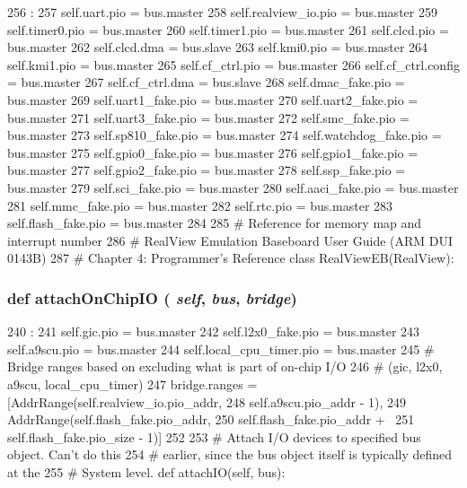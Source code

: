 \begin{DoxyCode}
256                            :
257        self.uart.pio          = bus.master
258        self.realview_io.pio   = bus.master
259        self.timer0.pio        = bus.master
260        self.timer1.pio        = bus.master
261        self.clcd.pio          = bus.master
262        self.clcd.dma          = bus.slave
263        self.kmi0.pio          = bus.master
264        self.kmi1.pio          = bus.master
265        self.cf_ctrl.pio       = bus.master
266        self.cf_ctrl.config    = bus.master
267        self.cf_ctrl.dma       = bus.slave
268        self.dmac_fake.pio     = bus.master
269        self.uart1_fake.pio    = bus.master
270        self.uart2_fake.pio    = bus.master
271        self.uart3_fake.pio    = bus.master
272        self.smc_fake.pio      = bus.master
273        self.sp810_fake.pio    = bus.master
274        self.watchdog_fake.pio = bus.master
275        self.gpio0_fake.pio    = bus.master
276        self.gpio1_fake.pio    = bus.master
277        self.gpio2_fake.pio    = bus.master
278        self.ssp_fake.pio      = bus.master
279        self.sci_fake.pio      = bus.master
280        self.aaci_fake.pio     = bus.master
281        self.mmc_fake.pio      = bus.master
282        self.rtc.pio           = bus.master
283        self.flash_fake.pio    = bus.master
284 
285 # Reference for memory map and interrupt number
286 # RealView Emulation Baseboard User Guide (ARM DUI 0143B)
287 # Chapter 4: Programmer's Reference
class RealViewEB(RealView):
\end{DoxyCode}
\hypertarget{classRealView_1_1RealViewPBX_abd74cec934f25d2881d5fdd0d5e7f512}{
\subsubsection[{attachOnChipIO}]{\setlength{\rightskip}{0pt plus 5cm}def attachOnChipIO ( {\em self}, \/   {\em bus}, \/   {\em bridge})}}
\label{classRealView_1_1RealViewPBX_abd74cec934f25d2881d5fdd0d5e7f512}



\begin{DoxyCode}
240                                          :
241        self.gic.pio = bus.master
242        self.l2x0_fake.pio = bus.master
243        self.a9scu.pio = bus.master
244        self.local_cpu_timer.pio = bus.master
245        # Bridge ranges based on excluding what is part of on-chip I/O
246        # (gic, l2x0, a9scu, local_cpu_timer)
247        bridge.ranges = [AddrRange(self.realview_io.pio_addr,
248                                   self.a9scu.pio_addr - 1),
249                         AddrRange(self.flash_fake.pio_addr,
250                                   self.flash_fake.pio_addr + \
251                                   self.flash_fake.pio_size - 1)]
252 
253     # Attach I/O devices to specified bus object.  Can't do this
254     # earlier, since the bus object itself is typically defined at the
255     # System level.
    def attachIO(self, bus):
\end{DoxyCode}


